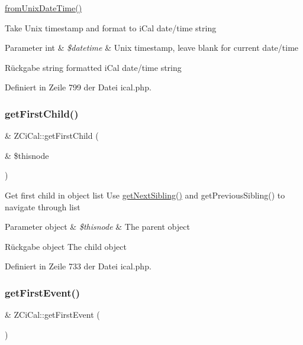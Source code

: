 \mbox{\hyperlink{class_z_ci_cal_a08385d87a6168835952fdc8e6118ee42}{from\+Unix\+Date\+Time()}}

Take Unix timestamp and format to i\+Cal date/time string


\begin{DoxyParams}[1]{Parameter}
int & {\em \$datetime} & Unix timestamp, leave blank for current date/time\\
\hline
\end{DoxyParams}
\begin{DoxyReturn}{Rückgabe}
string formatted i\+Cal date/time string 
\end{DoxyReturn}


Definiert in Zeile 799 der Datei ical.\+php.

\mbox{\label{class_z_ci_cal_afda835926af9504bffa24baa201793cf}} 
\subsubsection{\texorpdfstring{get\+First\+Child()}{getFirstChild()}}
{\footnotesize\ttfamily \& Z\+Ci\+Cal\+::get\+First\+Child (\begin{DoxyParamCaption}\item[{\&}]{\$thisnode }\end{DoxyParamCaption})}

Get first child in object list Use \mbox{\hyperlink{class_z_ci_cal_a58f91909ccb0ce0cd0252427945b0049}{get\+Next\+Sibling()}} and get\+Previous\+Sibling() to navigate through list


\begin{DoxyParams}[1]{Parameter}
object & {\em \$thisnode} & The parent object\\
\hline
\end{DoxyParams}
\begin{DoxyReturn}{Rückgabe}
object The child object 
\end{DoxyReturn}


Definiert in Zeile 733 der Datei ical.\+php.

\mbox{\label{class_z_ci_cal_ae688f91daf6de26451b26b2fc6da0454}} 
\subsubsection{\texorpdfstring{get\+First\+Event()}{getFirstEvent()}}
{\footnotesize\ttfamily \& Z\+Ci\+Cal\+::get\+First\+Event (\begin{DoxyParamCaption}{ }\end{DoxyParamCaption})}

